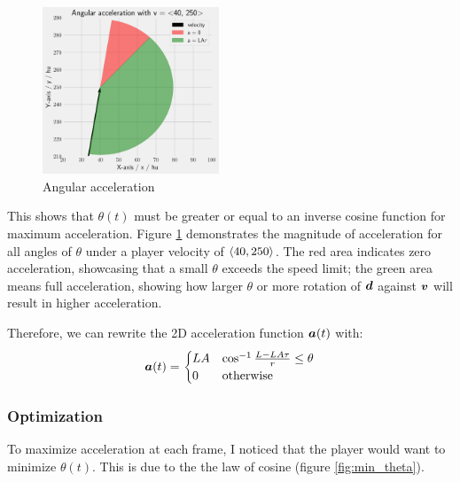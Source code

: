 \begin{figure}
    \includegraphics[width=0.47\textwidth,right]{assets/angular_acceleration_limiting.png}
    \caption{Angular acceleration}
    \label{fig:angular_acceleration_limiting}
\end{figure}

This shows that $\theta(t)$ must be greater or equal to an inverse cosine function for maximum acceleration. Figure \ref{fig:angular_acceleration_limiting} demonstrates the magnitude of acceleration for all angles of $\theta$ under a player velocity of $\left\langle 40, 250 \right\rangle$. The red area indicates zero acceleration, showcasing that a small $\theta$ exceeds the speed limit; the green area means full acceleration, showing how larger $\theta$ or more rotation of $\boldsymbol{d}$ against $\boldsymbol{v}$ will result in higher acceleration.

Therefore, we can rewrite the 2D acceleration function $\boldsymbol{a}(t)$ with:
\[
\boldsymbol{a}(t) = \begin{cases}
    LA & \cos^{-1} \frac{L - LA\tau}{r} \le \theta\\
    0 & \text{otherwise}
\end{cases}
\]


\subsubsection{Optimization}
To maximize acceleration at each frame, I noticed that the player would want to minimize $\theta(t)$. This is due to the the law of cosine (figure \ref{fig:min_theta}).

